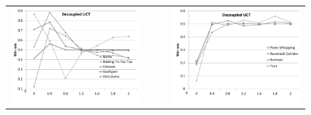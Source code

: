 \documentclass[conference]{IEEEtran}
\begin{document}
\begin{figure}[t!]
\centering
\begin{tabular}{ccc}
\hspace{-0.8cm}\includegraphics[scale=0.3]{figures/duct1} & ~~~ & \includegraphics[scale=0.3]{figures/duct2}\\

\end{tabular}
\end{figure}
\end{document}
